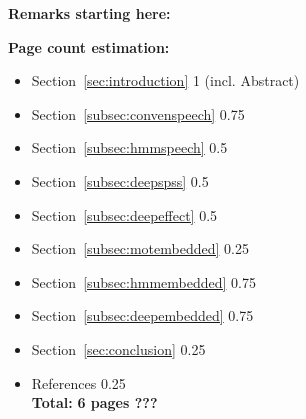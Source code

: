 

\clearpage

\textbf{\Large Remarks starting here:}

\vspace{2em}
\textbf{\large Page count estimation:}
\vspace{1em}
\begin{itemize}[leftmargin=10pt]	
	\item Section~\ref{sec:introduction}\hspace{4em} 			1 \hspace{2em} \textcolor{black!40}{(incl. Abstract)}
	\item Section~\ref{subsec:convenspeech}\hspace{3.35em} 		0.75
	\item Section~\ref{subsec:hmmspeech}\hspace{3.35em} 		0.5
	\item Section~\ref{subsec:deepspss}\hspace{3.35em}			0.5
	\item Section~\ref{subsec:deepeffect}\hspace{3.35em}		0.5
	\item Section~\ref{subsec:motembedded}\hspace{3.35em} 		0.25
	\item Section~\ref{subsec:hmmembedded}\hspace{3.35em} 		0.75
	\item Section~\ref{subsec:deepembedded}\hspace{3.35em} 		0.75
	\item Section~\ref{sec:conclusion}\hspace{4em}				0.25
	\item References\hspace{3.35em}								0.25\\[0.5em]
	\textbf{Total:}\hspace{5.2em} 								\textbf{6 pages ???}
\end{itemize}

